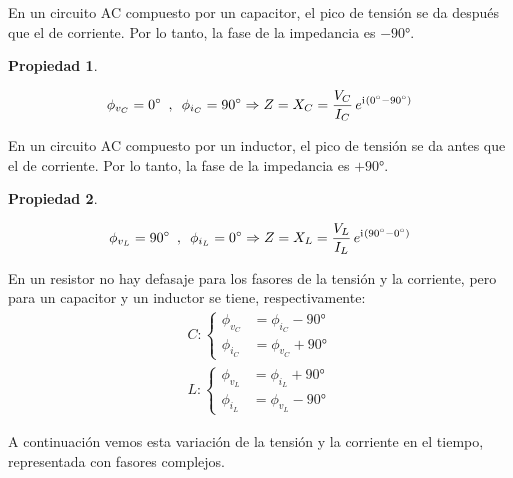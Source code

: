 \documentclass[a5paper,12pt,twoside]{book}
\newtheorem{prop}{{Propiedad}}[chapter]
\begin{document}
En un circuito AC compuesto por un capacitor, el pico de tensión se da después que el de corriente. Por lo tanto, la fase de la impedancia es $-\ang{90}$.

\begin{mdframed}[style=MyFrame1]
    \begin{prop}
    \end{prop}
    \begin{equation*}
        \phi_{v_C} = \ang{0} \enspace , \enspace \phi_{i_C} = \ang{90} \Rightarrow Z = X_C = \frac{V_C}{I_C} \, e^{\mathrm{i}\mkern1mu \left(\ang{0} - \ang{90}\right)}
    \end{equation*}
\end{mdframed}

En un circuito AC compuesto por un inductor, el pico de tensión se da antes que el de corriente. Por lo tanto, la fase de la impedancia es $+\ang{90}$.

\begin{mdframed}[style=MyFrame1]
    \begin{prop}
    \end{prop}
    \begin{equation*}
        \phi_{v_L} = \ang{90} \enspace , \enspace \phi_{i_L} = \ang{0} \Rightarrow Z = X_L = \frac{V_L}{I_L} \, e^{\mathrm{i}\mkern1mu \left(\ang{90} - \ang{0}\right)}
    \end{equation*}
\end{mdframed}

En un resistor no hay defasaje para los fasores de la tensión y la corriente, pero para un capacitor y un inductor se tiene, respectivamente:
\begin{gather*}
    C: \left\{
    \begin{aligned}
        \phi_{v_C} &= \phi_{i_C} - \ang{90}
        \\
        \phi_{i_C} &= \phi_{v_C} + \ang{90}
    \end{aligned}
    \right.
    \\[1em]
    L: \left\{
    \begin{aligned}
        \phi_{v_L} &= \phi_{i_L} + \ang{90}
        \\
        \phi_{i_L} &= \phi_{v_L} - \ang{90}
    \end{aligned}
    \right.
\end{gather*}

A continuación vemos esta variación de la tensión y la corriente en el tiempo, representada con fasores complejos.

\begin{center}
    \def\svgwidth{0.6\linewidth}
    
\end{center}
\end{document}
